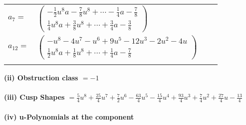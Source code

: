 \documentclass[1p]{elsarticle_modified}
\theoremstyle{definition}
\begin{document}
\begin{tabular}{m{7pt} m{180pt} m{7pt} m{180pt} }
\flushright $a_{7}=$&$\begin{pmatrix}-\frac{1}{2} u^8 a-\frac{7}{8} u^8+\cdots-\frac{1}{4} a-\frac{7}{8}\\\frac{1}{4} u^8 a+\frac{3}{8} u^8+\cdots+\frac{3}{4} a-\frac{3}{8}\end{pmatrix}$ \\
\flushright $a_{12}=$&$\begin{pmatrix}- u^8-4 u^7- u^6+9 u^5-12 u^3-2 u^2-4 u\\\frac{1}{2} u^8 a+\frac{1}{8} u^8+\cdots+\frac{1}{4} a-\frac{7}{8}\end{pmatrix}$\\&\end{tabular}
\flushleft \textbf{(ii) Obstruction class $= -1$}\\~\\
\flushleft \textbf{(iii) Cusp Shapes $= \frac{5}{4} u^8+\frac{25}{4} u^7+\frac{7}{2} u^6-\frac{63}{4} u^5-\frac{15}{4} u^4+\frac{93}{4} u^3+\frac{7}{4} u^2+\frac{27}{4} u-\frac{13}{4}$}\\~\\
\newpage\renewcommand{\arraystretch}{1}
\flushleft \textbf{(iv) u-Polynomials at the component}\newline \\
\end{document}
